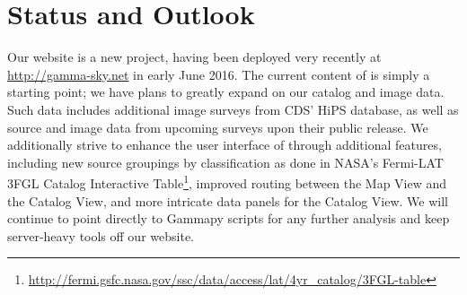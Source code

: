\section{Status and Outlook}


Our website is a new project, having been deployed very recently at \url{http://gamma-sky.net} in early June 2016. The current content of \gammasky is simply a starting point; we have plans to greatly expand on our catalog and image data. Such data includes additional image surveys from CDS' HiPS database, as well as source and image data from upcoming surveys upon their public release. We additionally strive to enhance the user interface of \gammasky through additional features, including new source groupings by classification as done in NASA's Fermi-LAT 3FGL Catalog Interactive Table\footnote[6]{\url{http://fermi.gsfc.nasa.gov/ssc/data/access/lat/4yr_catalog/3FGL-table}}, improved routing between the Map View and the Catalog View, and more intricate data panels for the Catalog View. We will continue to point directly to Gammapy scripts for any further analysis and keep server-heavy tools off our website.
